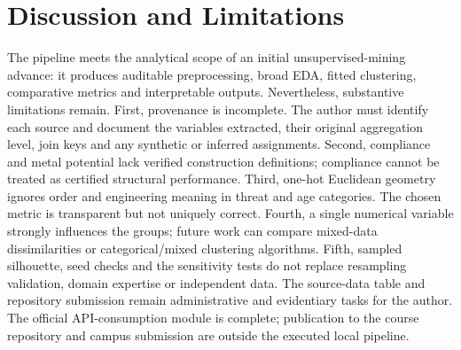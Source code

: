 \documentclass[conference]{IEEEtran}
\begin{document}
\section{Discussion and Limitations}
The pipeline meets the analytical scope of an initial unsupervised-mining advance: it produces auditable preprocessing, broad EDA, fitted clustering, comparative metrics and interpretable outputs. Nevertheless, substantive limitations remain.
First, provenance is incomplete. The author must identify each source and document the variables extracted, their original aggregation level, join keys and any synthetic or inferred assignments. Second, compliance and metal potential lack verified construction definitions; compliance cannot be treated as certified structural performance. Third, one-hot Euclidean geometry ignores order and engineering meaning in threat and age categories. The chosen metric is transparent but not uniquely correct. Fourth, a single numerical variable strongly influences the groups; future work can compare mixed-data dissimilarities or categorical/mixed clustering algorithms. Fifth, sampled silhouette, seed checks and the sensitivity tests do not replace resampling validation, domain expertise or independent data.
The source-data table and repository submission remain administrative and evidentiary tasks for the author. The official API-consumption module is complete; publication to the course repository and campus submission are outside the executed local pipeline.
\end{document}
